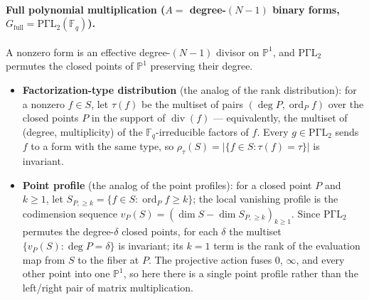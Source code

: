 \documentclass[11pt]{article}
\theoremstyle{definition}
\newcommand{\F}{\mathbb{F}}
\begin{document}
\paragraph{Full polynomial multiplication ($A=$ degree-$(N-1)$ binary forms, $G_{\mathrm{full}}=\mathrm{P\Gamma L}_2(\F_q)$).}
A nonzero form is an effective degree-$(N-1)$ divisor on $\mathbb{P}^1$, and
$\mathrm{P\Gamma L}_2$ permutes the closed points of $\mathbb{P}^1$ preserving
their degree.
\begin{itemize}
  \item \textbf{Factorization-type distribution} (the analog of the rank
    distribution): for a nonzero $f\in S$, let $\tau(f)$ be the multiset of
    pairs $(\deg P,\operatorname{ord}_P f)$ over the closed points $P$ in the
    support of $\operatorname{div}(f)$ --- equivalently, the multiset of
    (degree, multiplicity) of the $\F_q$-irreducible factors of $f$. Every
    $g\in\mathrm{P\Gamma L}_2$ sends $f$ to a form with the same type, so
    $\rho_\tau(S)=|\{f\in S:\tau(f)=\tau\}|$ is invariant.
  \item \textbf{Point profile} (the analog of the point profiles): for a closed
    point $P$ and $k\ge1$, let $S_{P,\ge k}=\{f\in S:\operatorname{ord}_P f\ge
    k\}$; the local vanishing profile is the codimension sequence
    $v_P(S)=(\dim S-\dim S_{P,\ge k})_{k\ge1}$. Since $\mathrm{P\Gamma L}_2$
    permutes the degree-$\delta$ closed points, for each $\delta$ the multiset
    $\{v_P(S):\deg P=\delta\}$ is invariant; its $k=1$ term is the rank of the
    evaluation map from $S$ to the fiber at $P$. The projective action fuses
    $0$, $\infty$, and every other point into one $\mathbb{P}^1$, so here there is
    a single point profile rather than the left/right pair of matrix
    multiplication.
\end{itemize}
\end{document}
